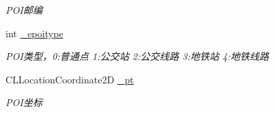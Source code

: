 \begin{DoxyCompactItemize}
\begin{DoxyCompactList}\small\item\em P\+O\+I邮编 \end{DoxyCompactList}\item 
\hypertarget{interface_b_m_k_poi_info_a5c00c72364b946887e29f42208cfa944}{}int \hyperlink{interface_b_m_k_poi_info_a5c00c72364b946887e29f42208cfa944}{\+\_\+epoitype}\label{interface_b_m_k_poi_info_a5c00c72364b946887e29f42208cfa944}

\begin{DoxyCompactList}\small\item\em P\+O\+I类型，0\+:普通点 1\+:公交站 2\+:公交线路 3\+:地铁站 4\+:地铁线路 \end{DoxyCompactList}\item 
\hypertarget{interface_b_m_k_poi_info_afe07d662e1b6c47a64cfa2bd8a70780b}{}C\+L\+Location\+Coordinate2\+D \hyperlink{interface_b_m_k_poi_info_afe07d662e1b6c47a64cfa2bd8a70780b}{\+\_\+pt}\label{interface_b_m_k_poi_info_afe07d662e1b6c47a64cfa2bd8a70780b}

\begin{DoxyCompactList}\small\item\em P\+O\+I坐标 \end{DoxyCompactList}\end{DoxyCompactItemize}
